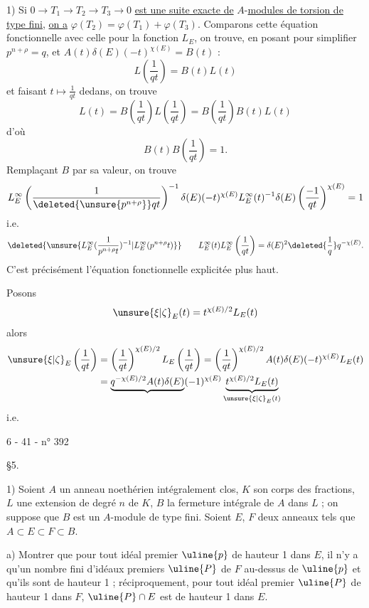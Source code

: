 1) Si $0\longrightarrow T_1\longrightarrow T_2\longrightarrow T_3\longrightarrow0$ \uline{est une suite exacte de} $A$-\uline{modules de torsion de type fini}, \uline{on a} $\varphi(T_2)=\varphi(T_1)+\varphi(T_3)$.
Comparons cette équation fonctionnelle avec celle pour la fonction $L_E$, on trouve, en  posant pour simplifier $p^{n+\rho}=q$, et $A(t)\delta(E)(-t)^{\chi(E)}=B(t)$ :
\[
L\left(\frac1{qt}\right)=B(t)L(t)
\]
et faisant $t\mapsto\frac1{qt}$ dedans, on trouve
\[
L(t)=B\left(\frac1{qt}\right)L\left(\frac1{qt}\right)=B\left(\frac1{qt}\right)B(t)L(t)
\]
d'où
\[
B(t)B\left(\frac1{qt}\right)=1.
\]
Remplaçant $B$ par sa valeur, on trouve
\[
L_E^\infty\left(\frac1{\deleted{\unsure{p^{n+\rho}}}qt}\right)^{-1}\delta(E)(-t)^{\chi(E)}L_E^\infty(t)^{-1}\delta(E)\left(\frac{-1}{qt}\right)^{\chi(E)}=1
\]
i.e.
\[
\deleted{\unsure{L_E^\infty(\frac1{p^{n+\rho}t})^{-1}|L_E^\infty(p^{n+\rho}t)}}
\qquad L_E^\infty(t)L_E^\infty\left(\frac1{qt}\right)=\delta(E)^2\deleted{\frac1q}q^{-\chi(E)}.
\]
C'est précisément l'équation fonctionnelle explicitée plus haut.

Posons
\[
\unsure{\xi|\zeta}_E(t)=t^{\chi(E)/2}L_E(t)
\]
alors
\[
\begin{aligned}
\unsure{\xi|\zeta}_E\left(\frac1{qt}\right)&=\left(\frac1{qt}\right)^{\chi(E)/2}L_E\left(\frac1{qt}\right)=\left(\frac1{qt}\right)^{\chi(E)/2}A(t)\delta(E)(-t)^{\chi(E)}L_E(t)\\
&=\underbrace{q^{-\chi(E)/2}A(t)\delta(E)}(-1)^{\chi(E)}\underbrace{t^{\chi(E)/2}L_E(t)}_{\unsure{\xi|\zeta}_E(t)}
\end{aligned}
\]
i.e.
\begin{center}6 - 41 - \hfill n° 392

\S 5.\end{center}
1) Soient $A$ un anneau noethérien intégralement clos, $K$ son corps des fractions, $L$ une extension de degré $n$ de $K$, $B$ la fermeture intégrale de $A$ dans $L$ ; on suppose que $B$ est un $A$-module de type fini. Soient $E$, $F$ deux anneaux tels que $A\subset E\subset F\subset B$.

a) Montrer que pour tout idéal premier $\uline{p}$ de hauteur 1 dans $E$, il n'y a qu'un nombre fini d'idéaux premiers $\uline{P}$ de $F$ au-dessus de $\uline{p}$ et qu'ils sont de hauteur 1 ; réciproquement, pour tout idéal premier $\uline{P}$ de hauteur 1 dans $F$, $\uline{P}\cap E$ est de hauteur 1 dans $E$.

